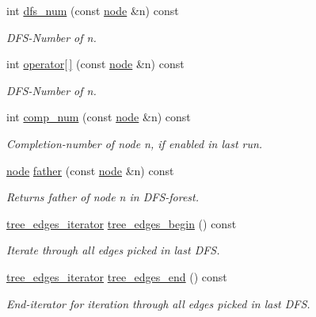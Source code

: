 \begin{DoxyCompactItemize}
int \mbox{\hyperlink{classdfs_a315f16831a0bd333960e87e045cb37c8}{dfs\+\_\+num}} (const \mbox{\hyperlink{classnode}{node}} \&n) const
\begin{DoxyCompactList}\small\item\em D\+F\+S-\/\+Number of {\itshape n}. \end{DoxyCompactList}\item 
int \mbox{\hyperlink{classdfs_a014b90894a47fa5abb7f4e5030be2c3e}{operator\mbox{[}$\,$\mbox{]}}} (const \mbox{\hyperlink{classnode}{node}} \&n) const
\begin{DoxyCompactList}\small\item\em D\+F\+S-\/\+Number of {\itshape n}. \end{DoxyCompactList}\item 
int \mbox{\hyperlink{classdfs_aceb066c806cb0beb5688b167a17387c7}{comp\+\_\+num}} (const \mbox{\hyperlink{classnode}{node}} \&n) const
\begin{DoxyCompactList}\small\item\em Completion-\/number of node {\itshape n}, if enabled in last run. \end{DoxyCompactList}\item 
\mbox{\hyperlink{classnode}{node}} \mbox{\hyperlink{classdfs_a3012717ce541b3e56943e2c2c50efdf6}{father}} (const \mbox{\hyperlink{classnode}{node}} \&n) const
\begin{DoxyCompactList}\small\item\em Returns father of node {\itshape n} in D\+F\+S-\/forest. \end{DoxyCompactList}\item 
\mbox{\hyperlink{classdfs_accde8d5403404f6d22fe4756d4ffedd5}{tree\+\_\+edges\+\_\+iterator}} \mbox{\hyperlink{classdfs_afe193938a05b114870c19163731273c8}{tree\+\_\+edges\+\_\+begin}} () const
\begin{DoxyCompactList}\small\item\em Iterate through all edges picked in last D\+FS. \end{DoxyCompactList}\item 
\mbox{\hyperlink{classdfs_accde8d5403404f6d22fe4756d4ffedd5}{tree\+\_\+edges\+\_\+iterator}} \mbox{\hyperlink{classdfs_ad1b9f759569cb52ba7ee415862c79831}{tree\+\_\+edges\+\_\+end}} () const
\begin{DoxyCompactList}\small\item\em End-\/iterator for iteration through all edges picked in last D\+FS. \end{DoxyCompactList}\item 

\end{DoxyCompactItemize}
